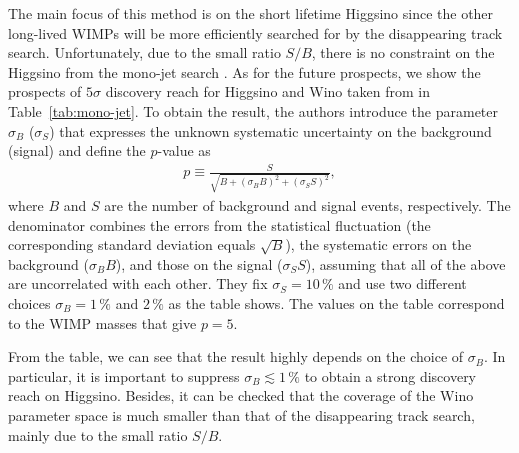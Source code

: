 \documentclass[12pt,twoside,book]{article}
\begin{document}
The main focus of this method is on the short lifetime Higgsino since the other long-lived WIMPs will be more efficiently searched for by the disappearing track search.
Unfortunately, due to the small ratio $S/B$, there is no constraint on the Higgsino from the mono-jet search \cite{Baer:2014cua}.
As for the future prospects, we show the prospects of $5\sigma$ discovery reach for Higgsino and Wino taken from \cite{Han:2018wus} in Table~\ref{tab:mono-jet}.
To obtain the result, the authors introduce the parameter $\sigma_B$ ($\sigma_S$) that expresses the unknown systematic uncertainty on the background (signal) and define the $p$-value as
\begin{align}
  p \equiv \frac{S}{\sqrt{B + (\sigma_B B)^2 + (\sigma_S S)^2}},
\end{align}
where $B$ and $S$ are the number of background and signal events, respectively.
The denominator combines the errors from the statistical fluctuation (the corresponding standard deviation equals $\sqrt{B}$), the systematic errors on the background ($\sigma_B B$), and those on the signal ($\sigma_S S$), assuming that all of the above are uncorrelated with each other.
They fix $\sigma_S = 10\,\%$ and use two different choices $\sigma_B = 1\,\%$ and $2\,\%$ as the table shows.
The values on the table correspond to the WIMP masses that give $p = 5$.

From the table, we can see that the result highly depends on the choice of $\sigma_B$.
In particular, it is important to suppress $\sigma_B \lesssim 1\, \%$ to obtain a strong discovery reach on Higgsino.
Besides, it can be checked that the coverage of the Wino parameter space is much smaller than that of the disappearing track search, mainly due to the small ratio $S/B$.


% 
% 
\end{document}
